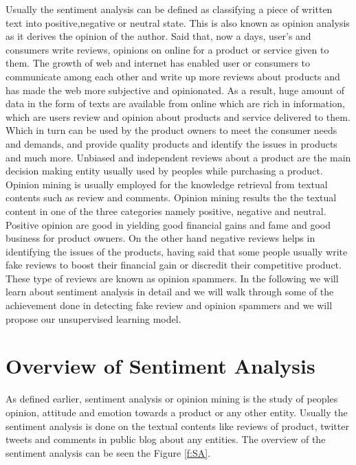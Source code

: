 \documentclass[sigconf]{acmart}
\begin{document}
Usually the sentiment analysis can be defined as classifying a piece of written text into positive,negative or neutral state. This is also known as opinion analysis as it derives the opinion of the author. Said that, now a days, user's and consumers write reviews, opinions on online for a product or service given to them. The growth of web and internet has enabled user or consumers to communicate among each other and write up more reviews about products and has made the web more subjective and opinionated. As a result, huge amount of data in the form of texts are available from online which are rich in information, which are users review and opinion about products and service delivered to them. Which in turn can be used by the product owners to meet the consumer needs and demands, and provide quality products and identify the issues in products and much more. Unbiased and independent reviews about a product are the main decision making entity usually used by peoples while purchasing a product. 
Opinion mining is usually employed for the knowledge retrieval from textual contents such as review and comments. Opinion mining results the the textual content in one of the three categories namely positive, negative and neutral. Positive opinion are good in yielding good financial gains and fame and good business for product owners. On the other hand negative reviews helps in identifying the issues of the products, having said that some people usually write fake reviews to boost their financial gain or discredit their competitive product. These type of reviews are known as opinion spammers. In the following we will learn about sentiment analysis in detail and we will walk through some of the achievement done in detecting fake review and opinion spammers and we will propose our unsupervised learning model.

\section{Overview of Sentiment Analysis}

As defined earlier, sentiment analysis or opinion mining is the study of peoples opinion, attitude and emotion towards a product or any other entity. Usually the sentiment analysis is done on the textual contents like reviews of product, twitter tweets and comments in public blog about any entities. The overview of the sentiment analysis can be seen the Figure \ref{f:SA}.
\end{document}

